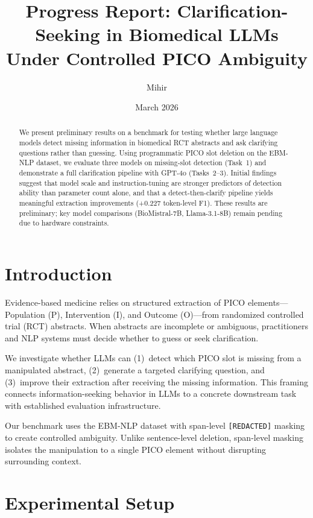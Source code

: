 \documentclass[11pt]{article}
\title{Progress Report: Clarification-Seeking in Biomedical LLMs \\
Under Controlled PICO Ambiguity}
\author{
  Mihir \\
}
\date{March 2026}
\begin{document}
\maketitle

\begin{abstract}
We present preliminary results on a benchmark for testing whether large language models detect missing information in biomedical RCT abstracts and ask clarifying questions rather than guessing.
Using programmatic PICO slot deletion on the EBM-NLP dataset, we evaluate three models on missing-slot detection (Task~1) and demonstrate a full clarification pipeline with GPT-4o (Tasks~2--3).
Initial findings suggest that model scale and instruction-tuning are stronger predictors of detection ability than parameter count alone, and that a detect-then-clarify pipeline yields meaningful extraction improvements (+0.227 token-level F1).
These results are preliminary; key model comparisons (BioMistral-7B, Llama-3.1-8B) remain pending due to hardware constraints.
\end{abstract}

\section{Introduction}

Evidence-based medicine relies on structured extraction of PICO elements---Population (P), Intervention (I), and Outcome (O)---from randomized controlled trial (RCT) abstracts.
When abstracts are incomplete or ambiguous, practitioners and NLP systems must decide whether to guess or seek clarification.

We investigate whether LLMs can (1)~detect which PICO slot is missing from a manipulated abstract, (2)~generate a targeted clarifying question, and (3)~improve their extraction after receiving the missing information.
This framing connects information-seeking behavior in LLMs to a concrete downstream task with established evaluation infrastructure.

Our benchmark uses the EBM-NLP dataset \citep{nye2018corpus} with span-level \texttt{[REDACTED]} masking to create controlled ambiguity.
Unlike sentence-level deletion, span-level masking isolates the manipulation to a single PICO element without disrupting surrounding context.

\section{Experimental Setup}
\end{document}
